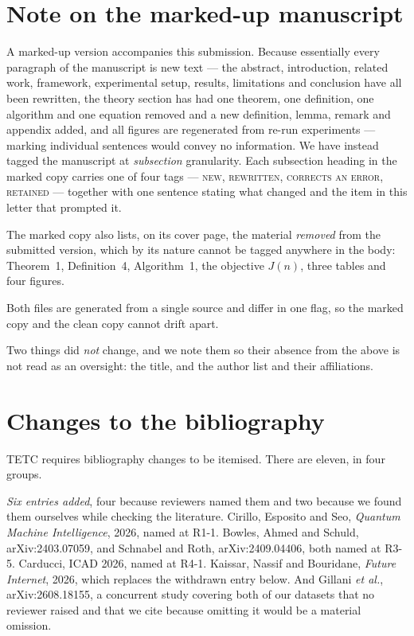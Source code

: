 \documentclass[11pt,a4paper]{article}
\begin{document}
\section{Note on the marked-up manuscript}

A marked-up version accompanies this submission. Because essentially every
paragraph of the manuscript is new text --- the abstract, introduction, related
work, framework, experimental setup, results, limitations and conclusion have
all been rewritten, the theory section has had one theorem, one definition, one
algorithm and one equation removed and a new definition, lemma, remark and
appendix added, and all figures are regenerated from re-run experiments ---
marking individual sentences would convey no information. We have instead
tagged the manuscript at \emph{subsection} granularity. Each subsection heading
in the marked copy carries one of four tags --- \textsc{new}, \textsc{rewritten},
\textsc{corrects an error}, \textsc{retained} --- together with one sentence
stating what changed and the item in this letter that prompted it.

The marked copy also lists, on its cover page, the material \emph{removed} from
the submitted version, which by its nature cannot be tagged anywhere in the
body: Theorem~1, Definition~4, Algorithm~1, the objective $J(n)$, three tables
and four figures.

Both files are generated from a single source and differ in one flag, so the
marked copy and the clean copy cannot drift apart.

Two things did \emph{not} change, and we note them so their absence from the
above is not read as an oversight: the title, and the author list and their
affiliations.

\section{Changes to the bibliography}

TETC requires bibliography changes to be itemised. There are eleven, in four
groups.

\emph{Six entries added}, four because reviewers named them and two because we
found them ourselves while checking the literature. Cirillo, Esposito and Seo,
\emph{Quantum Machine Intelligence}, 2026, named at R1-1. Bowles, Ahmed and
Schuld, arXiv:2403.07059, and Schnabel and Roth, arXiv:2409.04406, both named at
R3-5. Carducci, ICAD 2026, named at R4-1. Kaissar, Nassif and Bouridane,
\emph{Future Internet}, 2026, which replaces the withdrawn entry below. And
Gillani \emph{et al.}, arXiv:2608.18155, a concurrent study covering both of our
datasets that no reviewer raised and that we cite because omitting it would be a
material omission.
\end{document}

